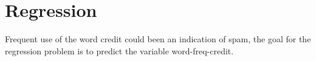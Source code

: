 \section{Regression}
Frequent use of the word credit could been an indication of spam, the goal for the regression problem is to predict the variable word-freq-credit.


\newpage

\newpage

